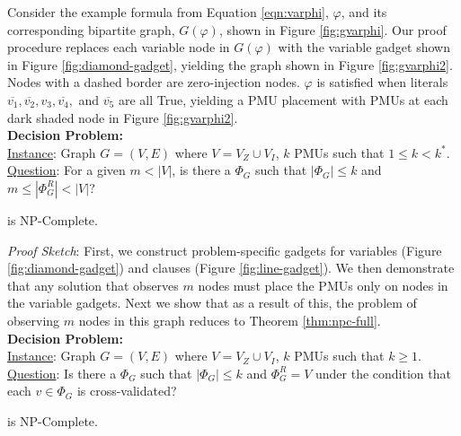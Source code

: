 Consider the example \sat formula from Equation \ref{eqn:varphi}, $\varphi$, and its corresponding bipartite graph, $G(\varphi)$, shown in Figure \ref{fig:gvarphi}.  
Our proof procedure replaces each variable node in $G(\varphi)$ with the variable gadget shown in Figure \ref{fig:diamond-gadget}, 
yielding the graph shown in Figure \ref{fig:gvarphi2}. Nodes with a dashed border are zero-injection nodes.  $\varphi$ is satisfied when literals $\overline{v_1}, \overline{v_2}, v_3, \overline{v_4},$ and $\overline{v_5}$ are all True,
yielding a PMU placement with PMUs at each dark shaded node in Figure \ref{fig:gvarphi2}.
\\
{\bf \maxinc Decision Problem:} \\
\indent \underline{Instance}: Graph $G=(V,E)$ where $V=V_Z \cup V_I$, $k$ PMUs such that $1 \leq k < k^*$. \\
\indent \underline{Question}: For a given $m< |V|$, is there a $\Phi_G$ such that $|\Phi_G| \leq k$ and $m \leq |\Phi^R_G| < |V|$? 

\begin{theorem}
\maxinc is NP-Complete.
\label{thm:npc-maxinc}
\end{theorem}

{\it Proof Sketch}:  First, we construct problem-specific gadgets for variables (Figure \ref{fig:diamond-gadget})  and clauses (Figure \ref{fig:line-gadget}). We then demonstrate that any solution that observes $m$ nodes must place the PMUs only on nodes
in the variable gadgets. Next we show that as a result of this, the problem of observing $m$ nodes in this graph reduces to Theorem \ref{thm:npc-full}. 
\\
{\bf \xval Decision Problem:} \\
\indent \underline{Instance}: Graph $G=(V,E)$ where $V=V_Z \cup V_I$, $k$ PMUs such that $k \geq 1$. \\
\indent \underline{Question}: Is there a $\Phi_G$ such that $|\Phi_G| \leq k$ and $\Phi^R_G = V$ under the condition that each $v \in \Phi_G$ is cross-validated?

\begin{theorem}
\xval is NP-Complete.
\label{thm:npc-xval}
\end{theorem}

